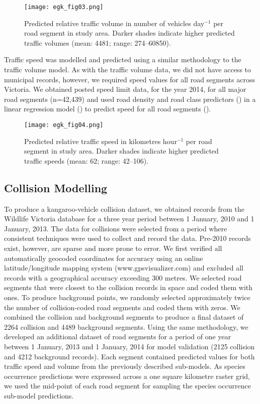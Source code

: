 \begin{figure*}[!t]
  \centering
  \texttt{[image: egk\_fig03.png]}
  \caption[Predicted relative traffic volume in Victoria]{Predicted relative traffic volume in number of vehicles day$^{-1}$ per road segment in study area. Darker shades indicate higher predicted traffic volumes (mean: 4481; range: 274--60850).}
  \label{egk_tvolmap}
\end{figure*}

Traffic speed was modelled and predicted using a similar methodology to the traffic volume model. As with the traffic volume data, we did not have access to municipal records, however, we required speed values for all road segments across Victoria. We obtained posted speed limit data, for the year 2014, for all major road segments (n=42,439) and used road density and road class predictors () in a linear regression model () to predict speed for all road segments (). 

\begin{figure*}[!t]
  \centering
  \texttt{[image: egk\_fig04.png]}
  \caption[Predicted relative traffic speed in Victoria]{Predicted relative traffic speed in kilometres hour$^{-1}$ per road segment in study area. Darker shades indicate higher predicted traffic speeds (mean: 62; range: 42--106).}
  \label{egk_tspdmap}
\end{figure*}

\subsection{Collision Modelling}

To produce a kangaroo-vehicle collision dataset, we obtained records from the Wildlife Victoria database for a three year period between 1 January, 2010 and 1 January, 2013. The data for collisions were selected from a period where consistent techniques were used to collect and record the data.  Pre-2010 records exist, however, are sparse and more prone to error.  We first verified all automatically geocoded coordinates for accuracy using an online latitude/longitude mapping system (www.gpsvisualizer.com) and excluded all records with a geographical accuracy exceeding 300 metres. We selected road segments that were closest to the collision records in space and coded them with ones. To produce background points, we randomly selected approximately twice the number of collision-coded road segments and coded them with zeros. We combined the collision and background segments to produce a final dataset of 2264 collision and 4489 background segments. Using the same methodology, we developed an additional dataset of road segments for a period of one year between 1 January, 2013 and 1 January, 2014 for model validation (2125 collision and 4212 background records). Each segment contained predicted values for both traffic speed and volume from the previously described sub-models. As species occurrence predictions were expressed across a one square kilometre raster grid, we used the mid-point of each road segment for sampling the species occurrence sub-model predictions.

